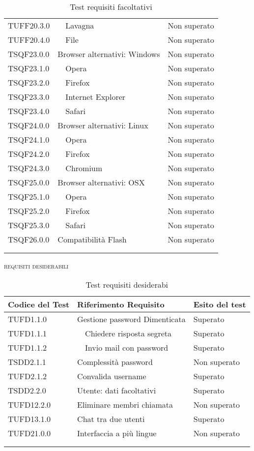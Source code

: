 \begin{longtable}{lp{}l}
TUFF20.3.0&	\ \ Lavagna		&Non superato\\
TUFF20.4.0&	\ \ File	&Non superato\\
TSQF23.0.0&	Browser alternativi: Windows	&Non superato\\
TSQF23.1.0&	\ \ Opera	&Non superato\\
TSQF23.2.0&	\ \ Firefox	&Non superato\\
TSQF23.3.0&	\ \ Internet Explorer	&Non superato\\
TSQF23.4.0&	\ \ Safari	&Non superato\\
TSQF24.0.0&	Browser alternativi: Linux	&Non superato\\
TSQF24.1.0&	\ \ Opera	&Non superato\\
TSQF24.2.0&	\ \ Firefox	&Non superato\\
TSQF24.3.0&	\ \ Chromium	&Non superato\\
TSQF25.0.0&	Browser alternativi: OSX	&Non superato\\
TSQF25.1.0&	\ \ Opera	&Non superato\\
TSQF25.2.0&	\ \ Firefox	&Non superato\\
TSQF25.3.0&	\ \ Safari &Non superato\\
TSQF26.0.0&	Compatibilità Flash	 &Non superato\\

\bottomrule\rowcolor{white}\\
\rowcolor{white}\caption{Test requisiti facoltativi} \label{tab:testFacoltativi}
\end{longtable}

\begin{center}
\textsc{requisiti desiderabili}
\end{center}
\begin{longtable}{lp{}l}
\toprule Codice del Test & Riferimento Requisito& Esito del test\\
\midrule

TUFD1.1.0&	Gestione password Dimenticata	&Superato\\
TUFD1.1.1&	\ \ Chiedere risposta segreta	&Superato\\
TUFD1.1.2&	\ \ Invio mail con password	&Superato\\
TSDD2.1.1&	Complessità password	&Non superato\\
TUFD2.1.2&	Convalida username	&Superato\\
TSDD2.2.0&	Utente: dati facoltativi	&Superato\\
TUFD12.2.0&	Eliminare membri chiamata	&Non superato\\
TUFD13.1.0&	Chat tra due utenti	&Superato\\
TUFD21.0.0&	Interfaccia a più lingue	&Non superato\\

\bottomrule\rowcolor{white}\\
\rowcolor{white}\caption{Test requisiti desiderabi} \label{tab:testDesiderabili}
\end{longtable}



